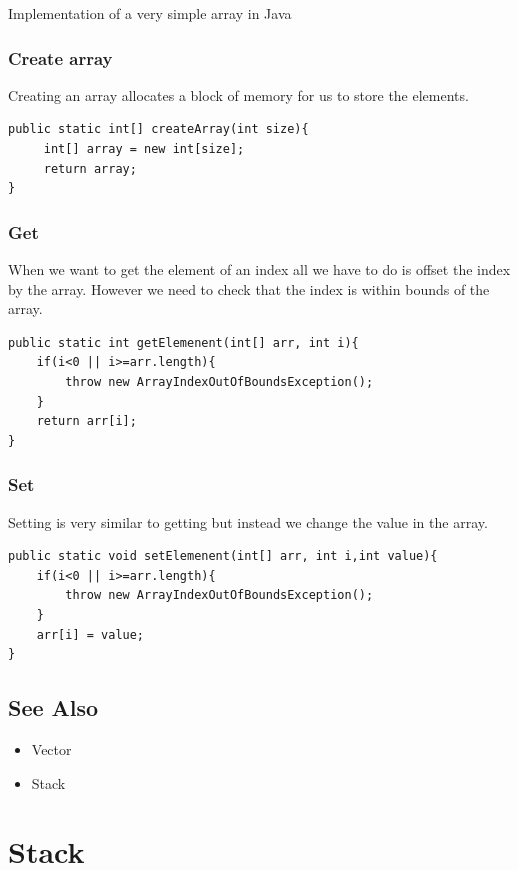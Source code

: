 \documentclass[11pt,oneside]{book}
\begin{document}
Implementation of a very simple array in Java

\subsubsection{Create array}

Creating an array allocates a block of memory for us to store the elements.

\begin{lstlisting}
public static int[] createArray(int size){
     int[] array = new int[size];
     return array;
}
\end{lstlisting}

\subsubsection{Get}

When we want to get the element of an index all we have to do is offset the index by the array. However we need to check that the index is within bounds of the array.

\begin{lstlisting}
public static int getElemenent(int[] arr, int i){
    if(i<0 || i>=arr.length){
        throw new ArrayIndexOutOfBoundsException();
    }
    return arr[i];
}
\end{lstlisting}

\subsubsection{Set}

Setting is very similar to getting but instead we change the value in the array.

\begin{lstlisting}
public static void setElemenent(int[] arr, int i,int value){
    if(i<0 || i>=arr.length){
        throw new ArrayIndexOutOfBoundsException();
    }
    arr[i] = value;
}
\end{lstlisting}

\subsection{See Also}

\begin{itemize}
\item Vector
\item Stack
\end{itemize}
\section{Stack}
\end{document}
